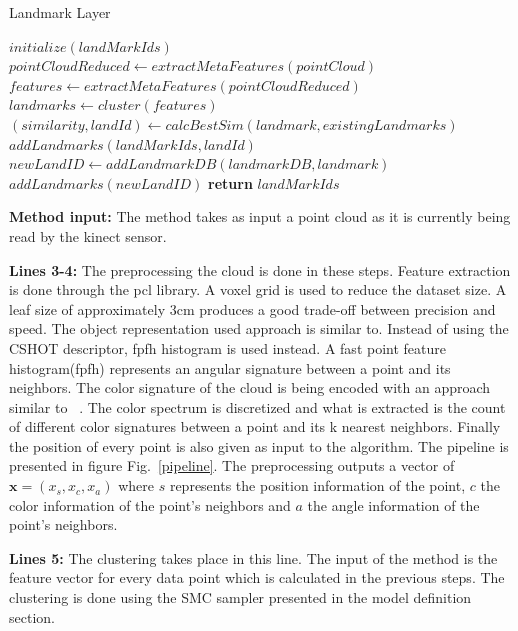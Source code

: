 \documentclass[]{article}
\begin{document}
\begin{algorithm}
    \caption{Landmark Layer}\label{euclid}
    \begin{algorithmic}[1]
        \State $initialize(landMarkIds)$
        \State $pointCloudReduced \gets extractMetaFeatures(pointCloud)$ 
        \State $features \gets extractMetaFeatures(pointCloudReduced)$
        \State $landmarks \gets cluster(features)$  
        \State $ (similarity, landId) \gets calcBestSim(landmark, existingLandmarks) $
        \State $ addLandmarks(landMarkIds, landId)$
        \Else 
        \State $ newLandID \gets addLandmarkDB(landmarkDB, landmark)$
        \State $addLandmarks(newLandID)$
        \EndIf
        \EndFor
        \State \textbf{return} $ landMarkIds$
        \EndProcedure
    \end{algorithmic}
\end{algorithm}


\textbf{Method input:} The method takes as input a point cloud as it is currently being read by the kinect sensor.

\textbf{Lines 3-4:} The preprocessing the cloud is done in these steps. Feature extraction is done through the pcl\cite{pcl} library. A voxel grid is used to reduce the dataset size. A leaf size of approximately 3cm produces a good trade-off between precision and speed. The object representation used approach is similar to\cite{objectpointslam}. Instead of using the CSHOT descriptor, fpfh\cite{fpfh} histogram is used instead. A fast point feature histogram(fpfh) represents an angular signature between a point and its neighbors. The color signature of the cloud is being encoded with an approach similar to ~\cite{smcddp}. The color spectrum is discretized and what is extracted is the count of different color signatures between a point and its k nearest neighbors. Finally the position of every point is also given as input to the algorithm. The pipeline is presented in figure Fig.~\ref{pipeline}. The preprocessing outputs a vector of $\textbf{x} =(x_s, x_c, x_a)$ where $s$ represents the position information of the point, $c$ the color information of the point's neighbors and $a$ the angle information of the point's neighbors.

\textbf{Lines 5:} The clustering takes place in this line. The input of the method is the feature vector for every data point which is calculated in the previous steps. The clustering is done using the SMC sampler presented in the model definition section. 
\end{document}
